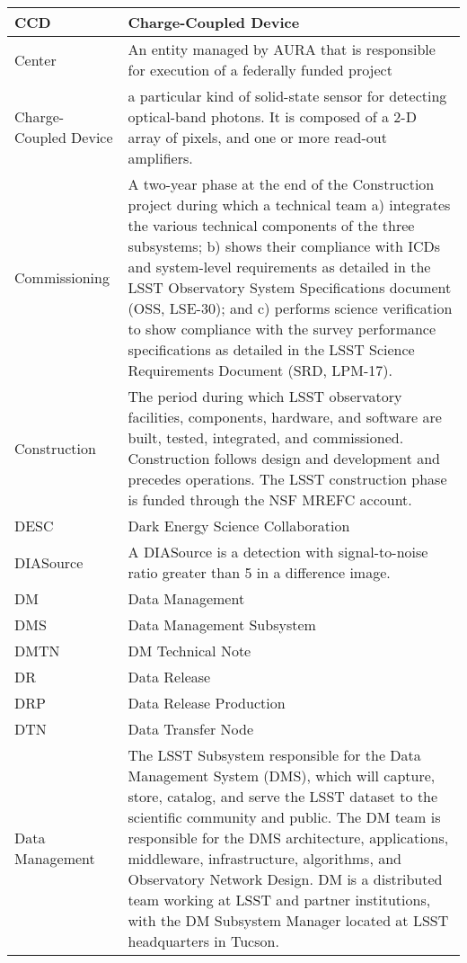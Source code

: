 \begin{longtable}{|l|p{}|}
CCD & \gls{Charge-Coupled Device} \\\hline
Center & An entity managed by \gls{AURA} that is responsible for execution of a federally funded project \\\hline
Charge-Coupled Device & a particular kind of solid-state sensor for detecting optical-band photons. It is composed of a 2-D array of pixels, and one or more read-out amplifiers. \\\hline
Commissioning & A two-year phase at the end of the \gls{Construction} project during which a technical team a) integrates the various technical components of the three subsystems; b) shows their compliance with ICDs and system-level requirements as detailed in the \gls{LSST} Observatory System Specifications document (\gls{OSS}, LSE-30); and c) performs science verification to show compliance with the survey performance specifications as detailed in the \gls{LSST} Science Requirements \gls{Document} (\gls{SRD}, LPM-17). \\\hline
Construction & The period during which \gls{LSST} observatory facilities, components, hardware, and software are built, tested, integrated, and commissioned. \gls{Construction} follows design and development and precedes operations. The \gls{LSST} construction phase is funded through the \gls{NSF} \gls{MREFC} account. \\\hline
DESC & Dark Energy \gls{Science Collaboration} \\\hline
DIASource & A \gls{DIASource} is a detection with signal-to-noise ratio greater than 5 in a difference image. \\\hline
DM & \gls{Data Management} \\\hline
DMS & \gls{Data Management} \gls{Subsystem} \\\hline
DMTN & \gls{DM} Technical Note \\\hline
DR & \gls{Data Release} \\\hline
DRP & \gls{Data Release} Production \\\hline
DTN & Data Transfer Node \\\hline
Data Management & The \gls{LSST} \gls{Subsystem} responsible for the \gls{Data Management} System (\gls{DMS}), which will capture, store, catalog, and serve the \gls{LSST} dataset to the scientific community and public. The \gls{DM} team is responsible for the \gls{DMS} architecture, applications, middleware, infrastructure, algorithms, and Observatory Network Design. \gls{DM} is a distributed team working at \gls{LSST} and partner institutions, with the \gls{DM} \gls{Subsystem} Manager located at \gls{LSST} headquarters in Tucson. \\\hline

\end{longtable}
